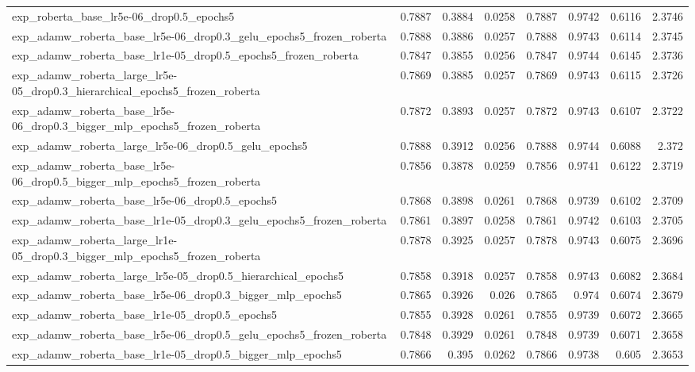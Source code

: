 \documentclass[a4paper,oneside,bibliography=totoc]{scrbook}
\begin{document}
\begin{landscape}
\begin{center}
\begin{longtable}{p{4cm} *{7}{r}}
        exp\_roberta\_base\_lr5e-06\_drop0.5\_epochs5 & 0.7887 & 0.3884 & 0.0258 & 0.7887 & 0.9742 & 0.6116 & 2.3746 \\ 
        exp\_adamw\_roberta\_base\_lr5e-06\_drop0.3\_gelu\_epochs5\_frozen\_roberta & 0.7888 & 0.3886 & 0.0257 & 0.7888 & 0.9743 & 0.6114 & 2.3745 \\ 
        exp\_adamw\_roberta\_base\_lr1e-05\_drop0.5\_epochs5\_frozen\_roberta & 0.7847 & 0.3855 & 0.0256 & 0.7847 & 0.9744 & 0.6145 & 2.3736 \\ 
        exp\_adamw\_roberta\_large\_lr5e-05\_drop0.3\_hierarchical\_epochs5\_frozen\_roberta & 0.7869 & 0.3885 & 0.0257 & 0.7869 & 0.9743 & 0.6115 & 2.3726 \\ 
        exp\_adamw\_roberta\_base\_lr5e-06\_drop0.3\_bigger\_mlp\_epochs5\_frozen\_roberta & 0.7872 & 0.3893 & 0.0257 & 0.7872 & 0.9743 & 0.6107 & 2.3722 \\ 
        exp\_adamw\_roberta\_large\_lr5e-06\_drop0.5\_gelu\_epochs5 & 0.7888 & 0.3912 & 0.0256 & 0.7888 & 0.9744 & 0.6088 & 2.372 \\ 
        exp\_adamw\_roberta\_base\_lr5e-06\_drop0.5\_bigger\_mlp\_epochs5\_frozen\_roberta & 0.7856 & 0.3878 & 0.0259 & 0.7856 & 0.9741 & 0.6122 & 2.3719 \\ 
        exp\_adamw\_roberta\_base\_lr5e-06\_drop0.5\_epochs5 & 0.7868 & 0.3898 & 0.0261 & 0.7868 & 0.9739 & 0.6102 & 2.3709 \\ 
        exp\_adamw\_roberta\_base\_lr1e-05\_drop0.3\_gelu\_epochs5\_frozen\_roberta & 0.7861 & 0.3897 & 0.0258 & 0.7861 & 0.9742 & 0.6103 & 2.3705 \\ 
        exp\_adamw\_roberta\_large\_lr1e-05\_drop0.3\_bigger\_mlp\_epochs5\_frozen\_roberta & 0.7878 & 0.3925 & 0.0257 & 0.7878 & 0.9743 & 0.6075 & 2.3696 \\ 
        exp\_adamw\_roberta\_large\_lr5e-05\_drop0.5\_hierarchical\_epochs5 & 0.7858 & 0.3918 & 0.0257 & 0.7858 & 0.9743 & 0.6082 & 2.3684 \\ 
        exp\_adamw\_roberta\_base\_lr5e-06\_drop0.3\_bigger\_mlp\_epochs5 & 0.7865 & 0.3926 & 0.026 & 0.7865 & 0.974 & 0.6074 & 2.3679 \\ 
        exp\_adamw\_roberta\_base\_lr1e-05\_drop0.5\_epochs5 & 0.7855 & 0.3928 & 0.0261 & 0.7855 & 0.9739 & 0.6072 & 2.3665 \\ 
        exp\_adamw\_roberta\_base\_lr5e-06\_drop0.5\_gelu\_epochs5\_frozen\_roberta & 0.7848 & 0.3929 & 0.0261 & 0.7848 & 0.9739 & 0.6071 & 2.3658 \\ 
        exp\_adamw\_roberta\_base\_lr1e-05\_drop0.5\_bigger\_mlp\_epochs5 & 0.7866 & 0.395 & 0.0262 & 0.7866 & 0.9738 & 0.605 & 2.3653 \\ 

\end{longtable}
\end{center}
\end{landscape}
\end{document}
